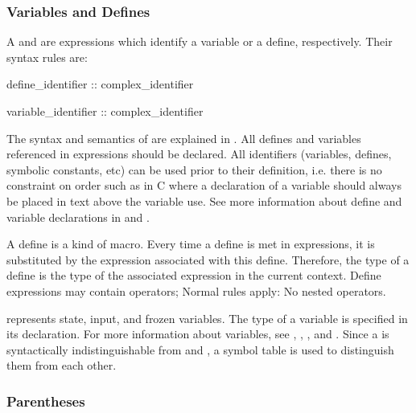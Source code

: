 \subsubsection{Variables and Defines}
\label{Variables and Defines}

A  and  are
expressions which identify a variable or a define, respectively. 
%
Their syntax rules are:

\begin{Grammar}
define_identifier :: complex_identifier

variable_identifier :: complex_identifier
\end{Grammar}
%
The syntax and semantics of  are explained
in .  
%
All defines and variables referenced in expressions should be
declared. All identifiers (variables, defines, symbolic constants,
etc) can be used prior to their definition, i.e. there is no constraint on
order such as in C where a declaration of a variable should always be
placed in text above the variable use.
%
See more information about define and variable declarations in
 and .

A define is a kind of macro. 
%
Every time a define is met in expressions, it is substituted by the
expression associated with this define. 
%
Therefore, the type of a define is the type of the associated
expression in the current context.
%
Define expressions may contain  operators; Normal rules
apply: No nested  operators.

 represents state, input, and frozen
variables. 
%
The type of a variable is specified in its declaration. 
%
For more information about variables, see , , , and
.
%
Since a  is syntactically indistinguishable
from  and
, a symbol table is used to distinguish
them from each other.

\subsubsection{Parentheses}
\label{Parentheses}

